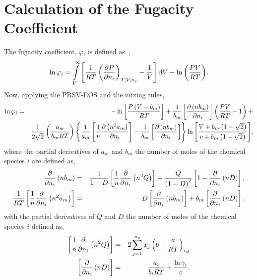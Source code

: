 \section{Calculation of the Fugacity Coefficient}\label{Chapter:EOSPR:Section:FugacityCoefficients}
The fugacity coefficient, $\varphi$, is defined as~\citep{SmithVanNess_Book},
    \begin{equation}
       \ln{\varphi_{i}} = \int\limits_{V}^{\infty}\left[\displaystyle\frac{1}{RT}\left(\displaystyle\frac{\partial P}{\partial n_{i}}\right)_{T,V,n_{j}} - \displaystyle\frac{1}{V}\right]\mathrm{d}{V} - \ln{\left(\displaystyle\frac{PV}{RT}\right)}.\label{Chapter:EOSPR:Eqn:FugacityCoeffDef}
    \end{equation}
Now, applying the PRSV-EOS and the \citet{wong_1992} mixing rules,
    \begin{eqnarray}
      \ln{\varphi_{i}} &=& -\ln{\left[\frc{P\left(V-b_{m}\right)}{RT}\right]} + \frc{1}{b_{m}}\left[\frc{\partial\left(nb_{m}\right)}{\partial n_{i}}\right]\left(\frc{PV}{RT}-1\right) + \nonumber \\%
         && \frc{1}{2\sqrt{2}}\left(\frc{a_{m}}{b_{m}RT}\right) \left\{ \frc{1}{a_{m}}\left[\frc{1}{n}\frc{\partial\left(n^{2}a_{m}\right)}{\partial n_{i}}\right] - \frc{1}{b_{m}} \left[\frc{\partial\left(nb_{m}\right)}{\partial n_{i}}\right] \right\} \ln{\left[\frc{V+b_{m}\left(1-\sqrt{2}\right)}{v+b_{m}\left(1+\sqrt{2}\right)}\right]},\label{Chapter:EOSPR:Section:FugacityCoefficients:Eqn:FugacityCoefficientDef}
    \end{eqnarray}
where the partial derivatives of $a_{m}$ and $b_{m}$ \wrt the number of moles of the chemical species $i$ are defined as,
    \begin{eqnarray}
        \displaystyle\frac{\partial}{\partial n_{i}}\left(nb_{m}\right) &=& \displaystyle\frac{1}{1-D}\left[\displaystyle\frac{1}{n}\displaystyle\frac{\partial}{\partial n_{i}}\left(n^{2}Q\right)\right] - \displaystyle\frac{Q}{\left(1-D\right)^{2}}\left[1-\displaystyle\frac{\partial}{\partial n_{i}}\left(nD\right)\right], \nonumber \\
       \displaystyle\frac{1}{RT}\left[\displaystyle\frac{1}{n}\displaystyle\frac{\partial}{\partial n_{i}}\left(n^{2}a_{m}\right)\right] &=& D\left[\displaystyle\frac{\partial}{\partial n_{i}}\left(nb_{m}\right)\right] + b_{m}\left[\displaystyle\frac{\partial}{\partial n_{i}} \left(nD\right)\right], \nonumber    
    \end{eqnarray}
with the partial derivatives of $Q$ and $D$ \wrt the number of moles of the chemical species $i$ defined as,
    \begin{eqnarray}
       \left[\displaystyle\frac{1}{n}\displaystyle\frac{\partial}{\partial n_{i}}\left(n^{2}Q\right)\right] &=& 2 \sum\limits_{j=1}^{n_{c}}x_{j}\left(b-\displaystyle\frac{a}{RT}\right)_{i,j} \nonumber \\
       \left[\displaystyle\frac{\partial}{\partial n_{i}} \left(nD\right)\right] &=& \displaystyle\frac{a_{i}}{b_{i}RT} + \displaystyle\frac{\ln{\gamma_{i}}}{c}.\nonumber
    \end{eqnarray}
